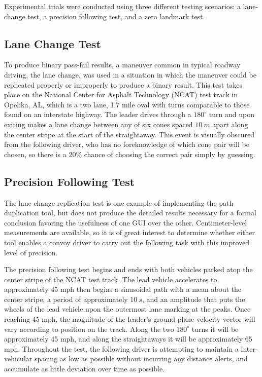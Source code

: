 \documentclass[twocolumn,10pt]{article}
\begin{document}
  Experimental trials were conducted using three different testing scenarios: a lane-change test, a precision following test, and a zero landmark test.  

  \subsection*{Lane Change Test}

    To produce binary pass-fail results, a maneuver common in typical roadway driving, the lane change, was used in a situation in which the maneuver could be replicated properly or improperly to produce a binary result.  This test takes place on the National Center for Asphalt Technology (NCAT) test track in Opelika, AL, which is a two lane, 1.7 mile oval with turns comparable to those found on an interstate highway.  The leader drives through a $180^{\circ}$ turn and upon exiting makes a lane change between any of six cones spaced $10~m$ apart along the center stripe at the start of the straightaway.  This event is visually obscured from the following driver, who has no foreknowledge of which cone pair will be chosen, so there is a 20\% chance of choosing the correct pair simply by guessing.

  \subsection*{Precision Following Test}

    The lane change replication test is one example of implementing the path duplication tool, but does not produce the detailed results necessary for a formal conclusion favoring the usefulness of one GUI over the other.  Centimeter-level measurements are available, so it is of great interest to determine whether either tool enables a convoy driver to carry out the following task with this improved level of precision.
    
    The precision following test begins and ends with both vehicles parked atop the center stripe of the NCAT test track.  The lead vehicle accelerates to approximately 45 mph then begins a sinusoidal path with a mean about the center stripe, a period of approximately $10~s$, and an amplitude that puts the wheels of the lead vehicle upon the outermost lane marking at the peaks.  Once reaching 45 mph, the magnitude of the leader’s ground plane velocity vector will vary according to position on the track.  Along the two $180^{\circ}$ turns it will be approximately 45 mph, and along the straightaways it will be approximately 65 mph.  Throughout the test, the following driver is attempting to maintain a inter-vehicular spacing as low as possible without incurring any distance alerts, and accumulate as little deviation over time as possible.
    
\end{document}

